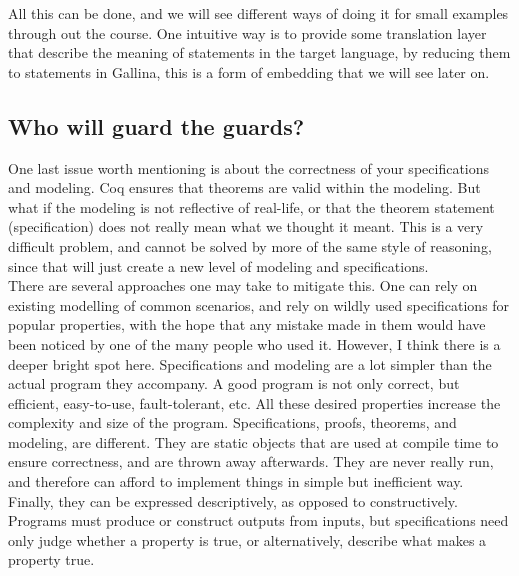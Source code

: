 \documentclass{article}
\begin{document}
All this can be done, and we will see different ways of doing it for small examples through out the course. One intuitive way is
to provide some translation layer that describe the meaning of statements in the target language, by reducing them to statements
in Gallina, this is a form of embedding that we will see later on.

\subsection{Who will guard the guards?}

One last issue worth mentioning is about the correctness of your specifications and modeling. Coq ensures that theorems
are valid within the modeling. But what if the modeling is not reflective of real-life, or that the theorem statement (specification)
does not really mean what we thought it meant. This is a very difficult problem, and cannot be solved by more of the same style of reasoning,
since that will just create a new level of modeling and specifications. \\

There are several approaches one may take to mitigate this. One can rely on existing modelling of common scenarios, and rely on wildly used
specifications for popular properties, with the hope that any mistake made in them would have been noticed by one of the many people
who used it. However, I think there is a deeper bright spot here. Specifications and modeling are a lot simpler than the actual program they
accompany. A good program is not only correct, but efficient, easy-to-use, fault-tolerant, etc. All these desired properties increase the complexity
and size of the program. Specifications, proofs, theorems, and modeling, are different. They are static objects that are used at compile
time to ensure correctness, and are thrown away afterwards. They are never really run, and therefore can afford to implement things
in simple but inefficient way. Finally, they can be expressed descriptively, as opposed to constructively. Programs must produce or construct
outputs from inputs, but specifications need only judge whether a property is true, or alternatively, describe what makes a property true. \\
\end{document}

